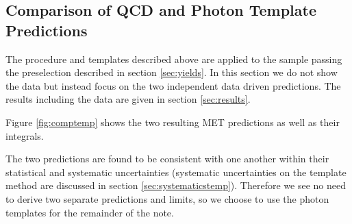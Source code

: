 


\subsection{Comparison of QCD and Photon Template Predictions}
\label{sec:tempcompresults}

The procedure and templates described above are applied to the \Z sample passing the preselection 
described in section \ref{sec:yields}. In this section we do not show the \Z data but instead 
focus on the two independent data driven predictions. The results including the \Z data are given 
in section \ref{sec:results}.

Figure \ref{fig:comptemp} shows the two resulting MET predictions as well as their integrals.

The two predictions are found to be consistent with one another within their statistical and 
systematic uncertainties (systematic uncertainties on the template method are discussed in 
section \ref{sec:systematicstemp}). Therefore we see no need to derive two separate predictions 
and limits, so we choose to use the photon templates for the remainder of the note.

